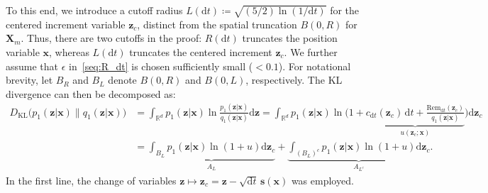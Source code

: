 \documentclass[
 longbibliography,
 twocolumn,
 superscriptaddress,
 amsmath,
 amssymb,
 amsthm,
 amsfonts,
 prl,
 floatfix,
]{revtex4-2}
\begin{document}
\begin{widetext}
To this end, we introduce a cutoff radius $L(\mathrm dt)\coloneq \sqrt{(5/2)\ln(1/\mathrm dt)}$ for the centered increment variable $\bm z_c$, distinct from the spatial truncation $B(0,R)$ for $\bm X_m$. Thus, there are two cutoffs in the proof: $R(\mathrm dt)$ truncates the position variable $\bm x$, whereas $L(\mathrm dt)$ truncates the centered increment $\bm z_c$. 
We further assume that $\epsilon$ in~\eqref{seq:R_dt} is chosen sufficiently small ($<0.1$). For notational brevity, let $B_R$ and $B_L$ denote $B(0,R)$ and $B(0,L)$, respectively. The KL divergence can then be decomposed as:
\begin{equation}
\begin{aligned}
    D_{\mathrm{KL}}\big(p_1(\bm z|\bm x)\|q_1(\bm z|\bm x)\big)
    &=\int_{\mathbb R^d}p_1(\bm z|\bm x)\ln\frac{p_1(\bm z|\bm x)}{q_1(\bm z|\bm x)}\mathrm d\bm z
    =\int_{\mathbb R^d}p_1(\bm z|\bm x)\ln\Bigg(1+
    \underbrace{
    c_{\mathrm dt}(\bm z_c)\,\mathrm dt+\frac{\mathrm{Rem}_{\mathrm dt}(\bm z_c)}{q_1(\bm z|\bm x)}
    }_{u(\bm z_c;\bm x)}
    \Bigg)\mathrm d\bm z_c
    \\
    &=
    \underbrace{
    \int_{B_L}\!\!p_1(\bm z|\bm x)\ln(1+u)\mathrm d\bm z_c
    }_{A_L}
    +
    \underbrace{
    \int_{(B_L)^c}\!\!p_1(\bm z|\bm x)\ln(1+u)\mathrm d\bm z_c
    }_{A_{L^c}}.
    \label{seq:A_D_KL_integral}
\end{aligned}
\end{equation}
In the first line, the change of variables $\bm z\mapsto\bm z_c=\bm z-\sqrt{\mathrm dt}\,\bm s(\bm x)$ was employed.


\end{widetext}
\end{document}
